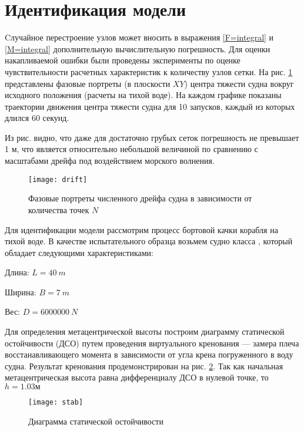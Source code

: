 \section{Идентификация модели}

Cлучайное перестроение узлов может вносить в выражения \eqref{F=integral} и \eqref{M=integral} дополнительную вычислительную погрешность. Для оценки накапливаемой ошибки были проведены эксперименты по оценке чувствительности расчетных характеристик к количеству узлов сетки. На рис. \ref{drift} представлены фазовые портреты  (в плоскости $XY$) центра тяжести судна вокруг исходного положения (расчеты на тихой воде). На каждом графике показаны траектории движения центра тяжести судна для 10 запусков, каждый из которых длился 60 секунд.

Из рис. видно, что даже для достаточно грубых сеток погрешность не превышает 1 м, что является относительно небольшой величиной по сравнению с масштабами дрейфа под воздействием морского волнения.

\begin{figure}[ht]
\begin{center}
\texttt{[image: drift]}
\end{center}
\caption{Фазовые портреты численного дрейфа судна в зависимости от количества точек $N$ }
\label{drift}
\end{figure}

Для идентификации модели рассмотрим процесс бортовой качки корабля на тихой воде.
В качестве испытательного образца возьмем судно класса , который обладает следующими характеристиками:

\begin{description}
	\item	Длина: $L = 40\ m$
	\item	Ширина: $B = 7\ m$
	\item	Вес: $D = 6 000 000\ N$
\end{description}

Для определения метацентрической высоты построим диаграмму статической остойчивости (ДСО) путем проведения виртуального кренования --- замера плеча восстанавливающего момента в зависимости от угла крена погруженного в воду судна. Результат кренования продемонстрирован на рис. \ref{stab}. Так как начальная метацентрическая высота равна дифференциалу ДСО в нулевой точке, то $h=1.03 м$

\begin{figure}[ht]
\begin{center}
\texttt{[image: stab]}
\end{center}
\caption{Диаграмма статической остойчивости}
\label{stab}
\end{figure}

